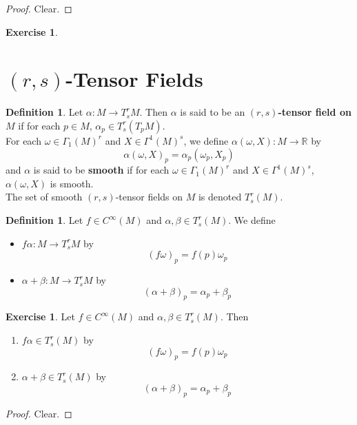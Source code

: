 \documentclass{book}
\theoremstyle{definition}
\newtheorem{defn}[definition]{Definition}
\newtheorem{ex}[definition]{Exercise}
\newcommand{\al}{\alpha}
\newcommand{\be}{\beta}
\newcommand{\om}{\omega}
\newcommand{\Gam}{\Gamma}
\newcommand{\R}{\mathbb{R}}
\DeclareMathOperator*{\0}{\mbf{0}}
\DeclareMathOperator*{\1}{\mbf{1}}
\newcommand{\tbf}[1]{\textbf{#1}}
\begin{document}
	\begin{proof}
	Clear.
	\end{proof}
	
	
	\begin{ex}
	
	\end{ex}
	
	
	
	
	
	
	
	
	\newpage
	\section{$(r,s)$-Tensor Fields}
	
	\begin{defn}
		Let $\al: M \rightarrow T^r_sM$. Then $\al$ is said to be an \tbf{$(r,s)$-tensor field on $M$} if for each $p \in M$, $\al_p \in T^r_s(T_pM)$. \\
		For each $\om \in \Gam_1(M)^r$ and $X \in \Gam^1(M)^s$, we define $\al(\om, X) : M \rightarrow \R$ by $$\al(\om, X)_p = \al_p(\om_p, X_p)$$
		and $\al$ is said to be \tbf{smooth} if for each $\om \in \Gam_1(M)^r$ and $X \in \Gam^1(M)^s$, $\al(\om, X)$ is smooth. \\
		The set of smooth $(r,s)$-tensor fields on $M$ is denoted $T^r_s(M)$.\\
	\end{defn}

	\begin{defn}
	Let $f \in C^{\infty}(M)$ and $\al,\be \in T^r_s(M)$. We define 
	\begin{itemize}
	\item $f\al: M \rightarrow T^r_sM$ by $$(f\om)_p = f(p)\om_p$$
	\item $\al+\be:  M \rightarrow T^r_sM$ by $$(\al+\be)_p = \al_p+\be_p$$
	\end{itemize}
	\end{defn}
	
	\begin{ex}
	Let $f \in C^{\infty}(M)$ and $\al,\be \in T^r_s(M)$. Then
	\begin{enumerate}
	\item $f\al \in T^r_s(M)$ by $$(f\om)_p = f(p)\om_p$$
	\item $\al+\be \in T^r_s(M)$ by $$(\al+\be)_p = \al_p+\be_p$$
	\end{enumerate}
	\end{ex}
	
	\begin{proof}
	Clear.
	\end{proof}
	
\end{document}
